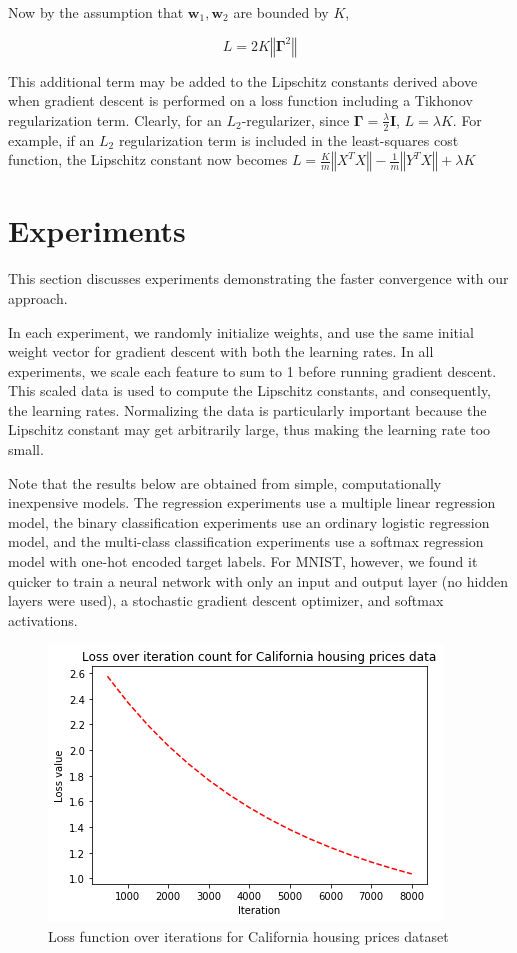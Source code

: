 \documentclass[sigconf,authordraft]{acmart}
\begin{document}
Now by the assumption that $\textbf{w}_1, \textbf{w}_2$ are bounded by $K$, 

\[
    \boxed{
        L = 2K \left\Vert \boldsymbol\Gamma^2 \right\Vert
    }
\]

This additional term may be added to the Lipschitz constants derived above when gradient descent is performed on a loss function including a Tikhonov regularization term. Clearly, for an $L_2$-regularizer, since $\boldsymbol\Gamma = \frac{\lambda}{2}\textbf{I}$, $L = \lambda K$. For example, if an $L_2$ regularization term is included in the least-squares cost function, the Lipschitz constant now becomes $L = \frac{K}{m}\left\Vert X^T X \right\Vert - \frac{1}{m} \left\Vert Y^T X \right\Vert + \lambda K$

\section{Experiments}
This section discusses experiments demonstrating the faster convergence with our approach. 

In each experiment, we randomly initialize weights, and use the same initial weight vector for gradient descent with both the learning rates. In all experiments, we scale each feature to sum to 1 before running gradient descent. This scaled data is used to compute the Lipschitz constants, and consequently, the learning rates. Normalizing the data is particularly important because the Lipschitz constant may get arbitrarily large, thus making the learning rate too small.

Note that the results below are obtained from simple, computationally inexpensive models. The regression experiments use a multiple linear regression model, the binary classification experiments use an ordinary logistic regression model, and the multi-class classification experiments use a softmax regression model with one-hot encoded target labels. For MNIST, however, we found it quicker to train a neural network with only an input and output layer (no hidden layers were used), a stochastic gradient descent optimizer, and softmax activations.

\begin{figure}
    \centering
    \includegraphics[scale=0.5]{cali.png}
    \caption{Loss function over iterations for California housing prices dataset}
    \label{fig:leastsq:1}
\end{figure}
\end{document}
